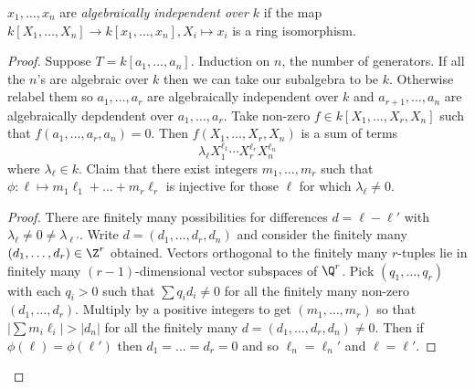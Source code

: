 \documentclass[a4paper]{article}
\begin{document}
\begin{definition}
  \(x_1, \dots, x_n\) are \emph{algebraically independent over \(k\)} if the map \(k[X_1, \dots, X_n] \to k[x_1, \dots, x_n], X_i \mapsto x_i\) is a ring isomorphism.
\end{definition}

\begin{proof}
  Suppose \(T = k[a_1, \dots, a_n]\). Induction on \(n\), the number of generators. If all the \(n\)'s are algebraic over \(k\) then we can take our subalgebra to be \(k\). Otherwise relabel them so \(a_1, \dots, a_r\) are algebraically independent over \(k\) and \(a_{r + 1}, \dots, a_n\) are algebraically depdendent over \(a_1, \dots, a_r\). Take non-zero \(f \in k[X_1, \dots, X_r, X_n]\) such that \(f(a_1, \dots, a_r, a_n) = 0\). Then \(f(X_1, \dots, X_r, X_n)\) is a sum of terms
  \[
    \lambda_\ell X_1^{\ell_1} \cdots X_r^{\ell_r} X_n^{\ell_n}
  \]
  where \(\lambda_\ell \in k\). Claim that there exist integers \(m_1, \dots, m_r\) such that \(\phi: \ell \mapsto m_1 \ell_1 + \dots + m_r \ell_r\) is injective for those \(\ell\) for which \(\lambda_\ell \neq 0\).

  \begin{proof}
    There are finitely many possibilities for differences \(d = \ell - \ell'\) with \(\lambda_\ell \neq 0 \neq \lambda_{\ell'}\). Write \(d = (d_1, \dots, d_r, d_n)\) and consider the finitely many \((d_1, \dots, d_r) \in \Z^r\) obtained. Vectors orthogonal to the finitely many \(r\)-tuples lie in finitely many \((r - 1)\)-dimensional vector subspaces of \(\Q^r\). Pick \((q_1, \dots, q_r)\) with each \(q_i > 0\) such that \(\sum q_id_i \neq 0\) for all the finitely many non-zero \((d_1, \dots, d_r)\). Multiply by a positive integers to get \((m_1, \dots, m_r)\) so that \(|\sum m_i \ell_i| > |d_n|\) for all the finitely many \(d = (d_1, \dots, d_r, d_n) \neq 0\). Then if \(\phi(\ell) = \phi(\ell')\) then \(d_1 = \dots = d_r = 0\) and so \(\ell_n = \ell_n'\) and \(\ell = \ell'\).
  \end{proof}


\end{proof}
\end{document}

